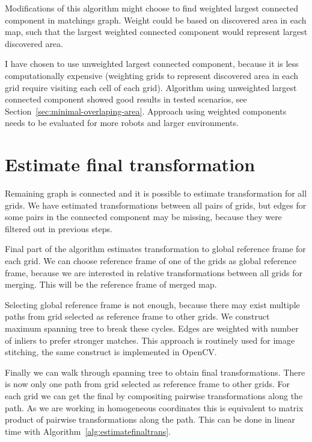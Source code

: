 Modifications of this algorithm might choose to find weighted largest connected component in matchings graph. Weight could be based on discovered area in each map, such that the largest weighted connected component would represent largest discovered area.

I have chosen to use unweighted largest connected component, because it is less computationally expensive (weighting grids to represent discovered area in each grid require visiting each cell of each grid). Algorithm using unweighted largest connected component showed good results in tested scenarios, see Section~\ref{sec:minimal-overlaping-area}. Approach using weighted components needs to be evaluated for more robots and larger environments.


\section{Estimate final transformation} %
\label{sec:estimatefinaltransformation}

Remaining graph is connected and it is possible to estimate transformation for all grids. We have estimated transformations between all pairs of grids, but edges for some pairs in the connected component may be missing, because they were filtered out in previous steps.

Final part of the algorithm estimates transformation to global reference frame for each grid. We can choose reference frame of one of the grids as global reference frame, because we are interested in relative transformations between all grids for merging. This will be the reference frame of merged map.

Selecting global reference frame is not enough, because there may exist multiple paths from grid selected as reference frame to other grids. We construct maximum spanning tree to break these cycles. Edges are weighted with number of inliers to prefer stronger matches. This approach is routinely used for image stitching, the same construct is implemented in \gls{OpenCV}.

Finally we can walk through spanning tree to obtain final transformations. There is now only one path from grid selected as reference frame to other grids. For each grid we can get the final by compositing pairwise transformations along the path. As we are working in homogeneous coordinates this is equivalent to matrix product of pairwise transformations along the path. This can be done in linear time with Algorithm~\ref{alg:estimatefinaltrans}.

